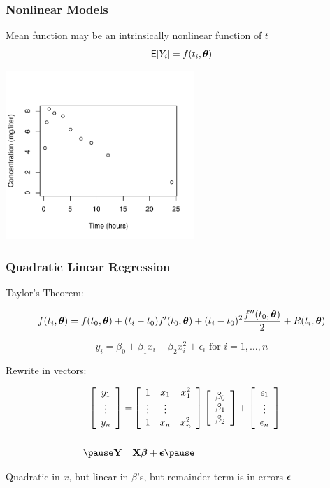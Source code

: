 \documentclass[]{beamer}
\begin{document}
\begin{frame}
  \frametitle{Nonlinear Models}
Mean function may be an intrinsically nonlinear function of $t$
  $$\textsf{E}[Y_i] = f(t_i, \boldsymbol{\theta})$$   

\centerline{ \includegraphics[height=2.5in]{theoph-fig1} }

\end{frame}
\begin{frame} \frametitle{Quadratic Linear Regression}
Taylor's Theorem:

$$f(t_i, \boldsymbol{\theta}) = f(t_0, \boldsymbol{\theta}) + (t_i - t_0) f'(t_0, \boldsymbol{\theta}) + (t_i - t_0)^2
\frac{f''(t_0, \boldsymbol{\theta})}{2}  + R(t_i, \boldsymbol{\theta})$$
\pause


$$y_i = \beta_0 + \beta_1 x_i + \beta_2 x_i^2 + \epsilon_i \text{  for  } i = 1, \ldots, n$$

\pause Rewrite in vectors:

\begin{eqnarray*}
\left[
\begin{array}{c}  y_1 \\ \vdots \\  y_n \end{array} 
  \right]   =  & 
 \left[ \begin{array}{ccc}  1 &  x_1 & x_1^2 \\ \vdots & \vdots \\ 1 &
     x_n &  x_n^2\end{array}  \right]   
 \left[ \begin{array}{c}  \beta_0  \\  \beta_1 \\ \beta_2 \end{array}
 \right] + 
\left[ \begin{array}{c}  \epsilon_1 \\ \vdots \\ \epsilon_n  \end{array}
\right] \\
 & \\ \pause
\Y = & \X \b + \eps \pause
\end{eqnarray*}

Quadratic in $x$, but linear in $\beta$'s, but remainder term is in
errors $\boldsymbol{\epsilon}$
\end{frame}
\end{document}
